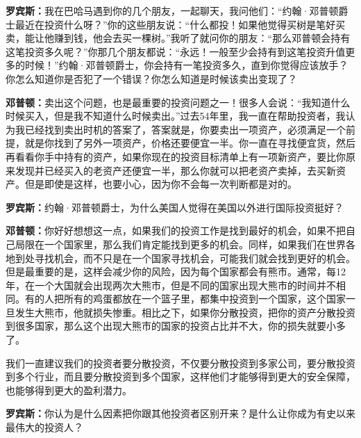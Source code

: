 \begin{BookQuote}
\textbf{罗宾斯：}我在巴哈马遇到你的几个朋友，一起聊天，我问他们：“约翰·邓普顿爵士最近在投资什么呀？”你的这些朋友说：“什么都投！如果他觉得买树是笔好买卖，能让他赚到钱，他会去买一棵树。”我听了就问你的朋友：“那么邓普顿会持有这笔投资多久呢？”你那几个朋友都说：“永远！一般至少会持有到这笔投资升值更多的时候！”约翰·邓普顿爵士，你会持有一笔投资多久，直到你觉得应该放手？你怎么知道你是否犯了一个错误？你怎么知道是时候该卖出变现了？
\end{BookQuote}

\begin{BookQuote}
\textbf{邓普顿：}卖出这个问题，也是最重要的投资问题之一！很多人会说：“我知道什么时候买入，但是我不知道什么时候卖出。”过去54年里，我一直在帮助投资者，我认为我已经找到卖出时机的答案了，答案就是，你要卖出一项资产，必须满足一个前提，就是你找到了另外一项资产，价格还要便宜一半。你一直在寻找便宜货，然后再看看你手中持有的资产，如果你现在的投资目标清单上有一项新资产，要比你原来发现并已经买入的老资产还便宜一半，那么你就可以把老资产卖掉，去买新资产。但是即使是这样，也要小心，因为你不会每一次判断都是对的。
\end{BookQuote}

\begin{BookQuote}
\textbf{罗宾斯：}约翰·邓普顿爵士，为什么美国人觉得在美国以外进行国际投资挺好？
\end{BookQuote}

\begin{BookQuote}
\textbf{邓普顿：}你好好想想这一点，如果我们的投资工作是找到最好的机会，如果不把自己局限在一个国家里，那么我们肯定能找到更多的机会。同样，如果我们在世界各地到处寻找机会，而不只是在一个国家寻找机会，可能我们就会找到更好的机会。但是最重要的是，这样会减少你的风险，因为每个国家都会有熊市。通常，每12年，在一个大国就会出现两次大熊市，但是不同的国家出现大熊市的时间并不相同。有的人把所有的鸡蛋都放在一个篮子里，都集中投资到一个国家，这个国家一旦发生大熊市，他就损失惨重。相比之下，如果你分散投资，把你的资产分散投资到很多国家，那么这个出现大熊市的国家的投资占比并不大，你的损失就要小多了。
\end{BookQuote}

我们一直建议我们的投资者要分散投资，不仅要分散投资到多家公司，要分散投资到多个行业，而且要分散投资到多个国家，这样他们才能够得到更大的安全保障，也能够得到更大的盈利潜力。

\begin{BookQuote}
\textbf{罗宾斯：}你认为是什么因素把你跟其他投资者区别开来？是什么让你成为有史以来最伟大的投资人？
\end{BookQuote}

